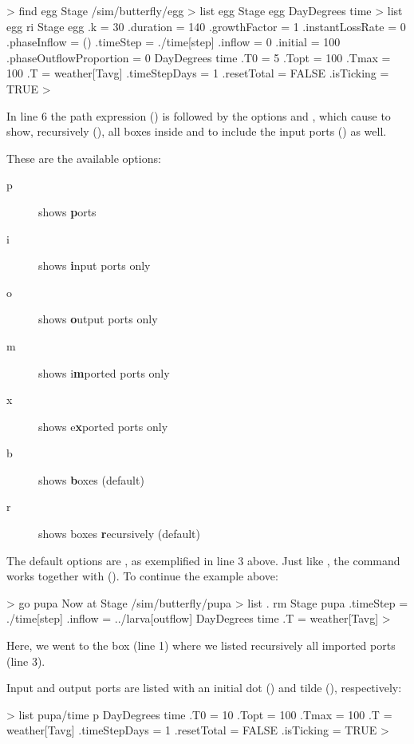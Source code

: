 \lstset{numbers=left}
\begin{usdialog}
> find egg
Stage /sim/butterfly/egg
> list egg
Stage egg
  DayDegrees time
> list egg ri
Stage egg
  .k = 30
  .duration = 140
  .growthFactor = 1
  .instantLossRate = 0
  .phaseInflow = ()
  .timeStep = ./time[step]
  .inflow = 0
  .initial = 100
  .phaseOutflowProportion = 0
  DayDegrees time
    .T0 = 5
    .Topt = 100
    .Tmax = 100
    .T = weather[Tavg]
    .timeStepDays = 1
    .resetTotal = FALSE
    .isTicking = TRUE
>
\end{usdialog}
\lstset{numbers=none}

In line 6 the path expression () is followed by the options  and , which cause  to show, recursively (), all boxes inside  and to include the input ports () as well. 

These are the available options:
\begin{description}
\item[p] shows \textbf{p}orts
\item[i] shows \textbf{i}nput ports only
\item[o] shows \textbf{o}utput ports only
\item[m] shows i\textbf{m}ported ports only
\item[x] shows e\textbf{x}ported ports only
\item[b] shows \textbf{b}oxes (default)
\item[r] shows boxes \textbf{r}ecursively (default)
\end{description}

The default options are , as exemplified in line 3 above. Just like , the  command works together with  (). To continue the example above:

\lstset{numbers=left}
\begin{usdialog}
> go pupa
Now at Stage /sim/butterfly/pupa
> list . rm
Stage pupa
  .timeStep = ./time[step]
  .inflow = ../larva[outflow]
  DayDegrees time
    .T = weather[Tavg]
>
\end{usdialog}
\lstset{numbers=none}

Here, we went to the  box (line 1) where we listed recursively all imported ports (line 3). 

Input and output ports are listed with an initial dot () and tilde (\code{\mytilde}), respectively:

\lstset{numbers=left}
\begin{usdialog}
> list pupa/time p
DayDegrees time
  .T0 = 10
  .Topt = 100
  .Tmax = 100
  .T = weather[Tavg]
  .timeStepDays = 1
  .resetTotal = FALSE
  .isTicking = TRUE
>
\end{usdialog}
\lstset{numbers=none}


